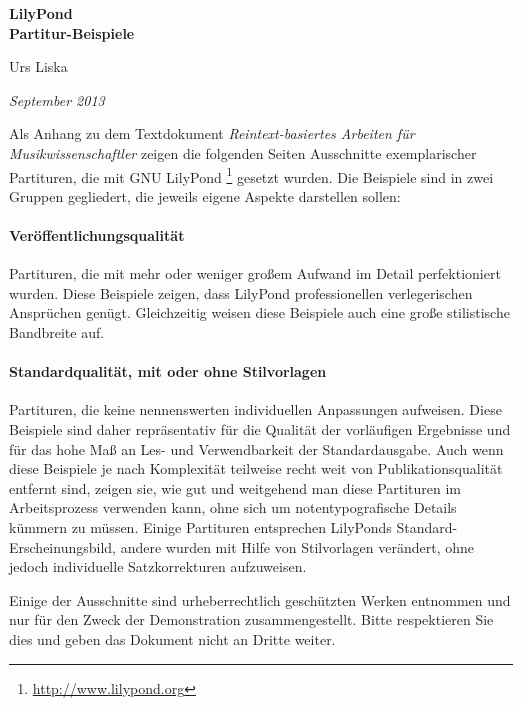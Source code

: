 \documentclass[DIV=12]{scrreprt}
\begin{document}
\begin{center}
\vspace*{3cm}
{ \Huge \textbf{\textsf{LilyPond\\
\vspace{1ex}
\huge Partitur-Beispiele}} }

\bigskip
{ \Large Urs Liska }

\emph{September 2013} 

\end{center}

\vspace{2cm}

Als Anhang zu dem Textdokument \emph{Reintext-basiertes Arbeiten für Musikwissenschaftler} zeigen die folgenden Seiten Ausschnitte exemplarischer Partituren, die mit GNU LilyPond%
\footnote{\url{http://www.lilypond.org}}
gesetzt wurden.
Die Beispiele sind in zwei Gruppen gegliedert, die jeweils eigene Aspekte darstellen sollen:
\paragraph{Veröffentlichungsqualität}
Partituren, die mit mehr oder weniger großem Aufwand im Detail perfektioniert wurden.
Diese Beispiele zeigen, dass LilyPond professionellen verlegerischen Ansprüchen genügt.
Gleichzeitig weisen diese Beispiele auch eine große stilistische Bandbreite auf.

\paragraph{Standardqualität, mit oder ohne Stilvorlagen}
Partituren, die keine nennenswerten individuellen Anpassungen aufweisen.
Diese Beispiele sind daher repräsentativ für die Qualität der vorläufigen Ergebnisse und für das hohe Maß an Les- und Verwendbarkeit der Standardausgabe.
Auch wenn diese Beispiele je nach Komplexität teilweise recht weit von Publikationsqualität entfernt sind, zeigen sie, wie gut und weitgehend man diese Partituren im Arbeitsprozess verwenden kann, ohne sich um notentypografische Details kümmern zu müssen.
Einige Partituren entsprechen LilyPonds Standard-Erscheinungsbild, andere wurden mit Hilfe von Stilvorlagen verändert, ohne jedoch individuelle Satzkorrekturen aufzuweisen.

Einige der Ausschnitte sind urheberrechtlich geschützten Werken entnommen und nur für den Zweck der Demonstration zusammengestellt.
Bitte respektieren Sie dies und geben das Dokument nicht an Dritte weiter.
\end{document}
